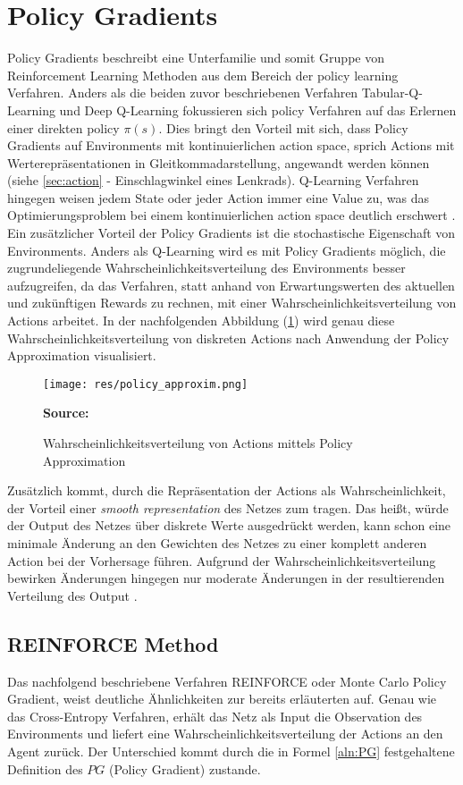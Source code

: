 \documentclass[11pt]{scrartcl}
\newcommand{\source}[1]{\vspace{-5pt} \caption*{\hfill \textbf{Source:} {#1}} }
\begin{document}
\section{Policy Gradients}
Policy Gradients beschreibt eine Unterfamilie und somit Gruppe von Reinforcement Learning 
Methoden aus dem Bereich der policy learning Verfahren. Anders als die beiden zuvor
beschriebenen Verfahren Tabular-Q-Learning und Deep Q-Learning fokussieren sich policy
Verfahren auf das Erlernen einer direkten policy $\pi(s)$. Dies bringt den Vorteil mit sich,
dass Policy Gradients auf Environments mit kontinuierlichen action space, sprich Actions mit
Werterepräsentationen in Gleitkommadarstellung, angewandt werden können (siehe
\ref{sec:action}  - Einschlagwinkel eines Lenkrads). Q-Learning Verfahren
hingegen weisen jedem State oder jeder Action immer eine Value zu, was das Optimierungsproblem
bei einem kontinuierlichen action space deutlich erschwert \cite[~S.242]{L2018}. Ein
zusätzlicher Vorteil der Policy Gradients ist die stochastische Eigenschaft von Environments.
Anders als Q-Learning wird es mit Policy Gradients möglich, die zugrundeliegende
Wahrscheinlichkeitsverteilung des Environments besser aufzugreifen, da das Verfahren, statt
anhand von Erwartungswerten des aktuellen und zukünftigen Rewards zu rechnen, mit einer
Wahrscheinlichkeitsverteilung von Actions arbeitet. In der nachfolgenden Abbildung 
(\ref{fig:prob-dist-pg}) wird genau diese Wahrscheinlichkeitsverteilung von diskreten Actions
nach Anwendung der Policy Approximation visualisiert.

\begin{figure}[htp]
\centering
\texttt{[image: res/policy\_approxim.png]}
\caption{Wahrscheinlichkeitsverteilung von Actions mittels Policy Approximation}
\source{\cite[~S.243 - Chapter 9 - Figure 1]{L2018}}
\label{fig:prob-dist-pg}
\end{figure}

Zusätzlich kommt, durch die Repräsentation der Actions als Wahrscheinlichkeit, der Vorteil einer
\textit{smooth representation} des Netzes zum tragen. Das heißt, würde der Output des Netzes über
diskrete Werte ausgedrückt werden, kann schon eine minimale Änderung an den Gewichten des Netzes 
zu einer komplett anderen Action bei der Vorhersage führen. Aufgrund der
Wahrscheinlichkeitsverteilung bewirken Änderungen hingegen nur moderate Änderungen in der
resultierenden Verteilung des Output \cite[~S.243]{L2018}.


\subsection{REINFORCE Method}
Das nachfolgend beschriebene Verfahren REINFORCE oder Monte Carlo Policy Gradient, weist
deutliche Ähnlichkeiten zur bereits erläuterten  auf.
Genau wie das Cross-Entropy Verfahren, erhält das Netz als Input die Observation des
Environments und liefert eine Wahrscheinlichkeitsverteilung der Actions an den Agent
zurück. Der Unterschied kommt durch die in Formel \ref{aln:PG} festgehaltene Definition
des $PG$ (Policy Gradient) zustande.
\end{document}
